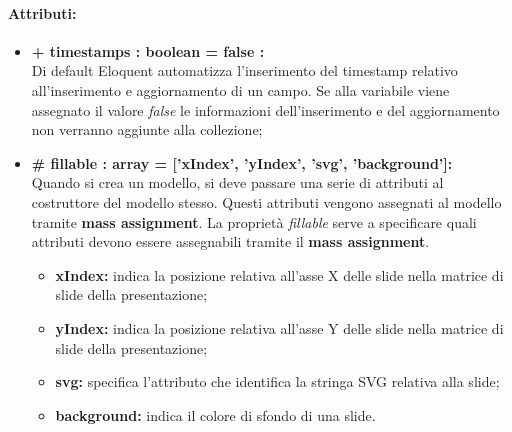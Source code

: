 	\paragraph{Attributi:}
	\begin{itemize}
		\item \textbf{+ timestamps : boolean = false :}\\
		Di default Eloquent automatizza l'inserimento del timestamp relativo all'inserimento e aggiornamento di un campo. Se alla variabile viene assegnato il valore \textit{false} le informazioni dell'inserimento e del aggiornamento non verranno aggiunte alla collezione;
		\item \textbf{\# fillable : array = [’xIndex’, ’yIndex', 'svg', 'background']:}\\
		Quando si crea un modello, si deve passare una serie di attributi al costruttore del modello stesso. Questi attributi vengono assegnati al modello tramite \textbf{mass assignment}. La proprietà \textit{fillable} serve a specificare quali attributi devono essere assegnabili tramite il \textbf{mass assignment}.
		\begin{itemize}
			\item \textbf{xIndex:} indica la posizione relativa all'asse X delle \gls{slide} nella matrice di \gls{slide} della presentazione;
			\item \textbf{yIndex:} indica la posizione relativa all'asse Y delle \gls{slide} nella matrice di \gls{slide} della presentazione;
			\item \textbf{svg:} specifica l'attributo che identifica la stringa SVG relativa alla \gls{slide};
			\item \textbf{background:} indica il colore di sfondo di una \gls{slide}.
		\end{itemize}
	\end{itemize}
	
